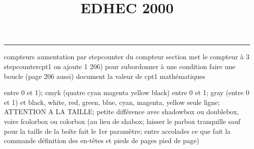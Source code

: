 \documentclass[11pt]{article}%
\title{\bf \vspace{-2cm} EDHEC 2000} %
\author{} %
\date{} %
\renewcommand{\headrulewidth}{0pt}%
\renewcommand{\footrulewidth}{0.4pt}%
\begin{document}
\maketitle %
\vspace{-1.4cm}\hrule %
\thispagestyle{fancy}

\vspace*{.2cm}



compteurs%
aumentation par stepcounter du compteur section%
met le compteur à 3%
stepcounter{cpt1} on ajoute 1%
206) pour subordonner à une condition %
faire une boucle (page 206 aussi) %
document la valeur de cpt1 
mathématiques\newcommand{\ch}{\operatorname{ch}} 
\newcommand{\sh}{\operatorname{sh}}
\renewcommand{\tanh}{\operatorname{th}}
\renewcommand{\sinh}{\operatorname{sh}}
\renewcommand{\cosh}{\operatorname{ch}}
\newcommand{\argsh}{\operatorname{argsh}}
\newcommand{\argch}{\operatorname{argch}}
\newcommand{\argth}{\operatorname{argth}}
\newcommand{\ker}{\operatorname{Ker}}
\renewcommand{\im}{\operatorname{Im}}
\newcommand{\rg}{\operatorname{rg}}
\newcommand{\Id}{\operatorname{Id}}
\newcommand{\id}{\operatorname{id}}
\renewcommand{\leq}{\leq}
\renewcommand{\geq}{\geq }

entre 0 et 1); cmyk (quatre cyan magenta yellow black) entre 0 et 1;
gray (entre 0 et 1) et black, white, red, green, blue, cyan, magenta,
yellow%
seule ligne; ATTENTION A LA TAILLE; petite différence avec shadowbox ou
doublebox, voire fcolorbox ou colorbox (au lieu de shabox; laisser le
parbox tranquille sauf pour la taille de la boîte
\newcommand{\Tbox}[1]{\begin{center} \shabox{\parbox{0.6
\linewidth}{#1}} \end{center}} %
fait le 1er paramètre; entre accolades ce que fait la commande
définition des en-têtes et pieds de pages\pagestyle{fancy}
\chead{}
\rfoot[ \ \thepage]{\thepage}
\cfoot{}
\lfoot{}
\thispagestyle{fancy} %
pied de page)\renewcommand{\footrulewidth}{0.4pt}
\renewcommand{\headrulewidth}{0.4pt}
\end{document}
